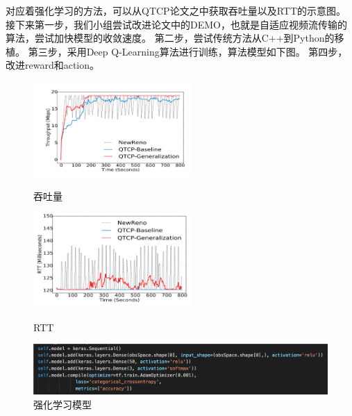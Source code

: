 对应着强化学习的方法，可以从QTCP论文之中获取吞吐量以及RTT的示意图。
接下来第一步，我们小组尝试改进论文中的DEMO，也就是自适应视频流传输的算法，尝试加快模型的收敛速度。
第二步，尝试传统方法从C++到Python的移植。
第三步，采用Deep Q-Learning算法进行训练，算法模型如下图。
第四步，改进reward和action。

\begin{figure}[htbp]
\centering
\begin{minipage}[t]{0.48\textwidth}
\centering
\includegraphics[width=6cm]{figure/figure3.png}
\caption{吞吐量}
\end{minipage}
\begin{minipage}[t]{0.48\textwidth}
\centering
\includegraphics[width=6cm]{figure/figure4.png}
\caption{RTT}
\end{minipage}
\centering
	\includegraphics[width=0.8\linewidth]{figure/figure5.png}
	\caption{强化学习模型}
	\label{figure5}
\end{figure}